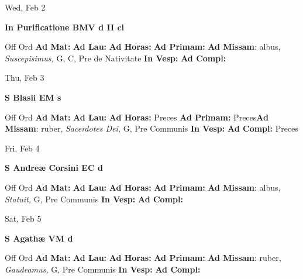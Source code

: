 \documentclass[10pt]{memoir}
\begin{document}
\begin{center}
\begin{minipage}{3.5in}
\vspace{2em}
\begin{center}Wed, Feb 2
\end{center}
\textbf{ \large In Purificatione BMV
\textnormal{\normalsize d II cl}}

\begin{justify}Off Ord
\textbf{Ad Mat: }
\textbf{Ad Lau: }
\textbf{Ad Horas: }
\textbf{Ad Primam: }\textbf{Ad Missam}: albus, \textit{Suscepisimus,} G, C, Pre de Nativitate
\textbf{In Vesp: }
\textbf{Ad Compl: }
\end{justify}
\end{minipage}
\end{center}

\begin{center}
\begin{minipage}{3.5in}
\vspace{2em}
\begin{center}Thu, Feb 3
\end{center}
\textbf{ \large S Blasii EM
\textnormal{\normalsize s}}

\begin{justify}Off Ord
\textbf{Ad Mat: }
\textbf{Ad Lau: }
\textbf{Ad Horas: }Preces
\textbf{Ad Primam: }Preces\textbf{Ad Missam}: ruber, \textit{Sacerdotes Dei,} G, Pre Communis
\textbf{In Vesp: }
\textbf{Ad Compl: }Preces
\end{justify}
\end{minipage}
\end{center}

\begin{center}
\begin{minipage}{3.5in}
\vspace{2em}
\begin{center}Fri, Feb 4
\end{center}
\textbf{ \large S Andreæ Corsini EC
\textnormal{\normalsize d}}

\begin{justify}Off Ord
\textbf{Ad Mat: }
\textbf{Ad Lau: }
\textbf{Ad Horas: }
\textbf{Ad Primam: }\textbf{Ad Missam}: albus, \textit{Statuit,} G, Pre Communis
\textbf{In Vesp: }
\textbf{Ad Compl: }
\end{justify}
\end{minipage}
\end{center}

\begin{center}
\begin{minipage}{3.5in}
\vspace{2em}
\begin{center}Sat, Feb 5
\end{center}
\textbf{ \large S Agathæ VM
\textnormal{\normalsize d}}

\begin{justify}Off Ord
\textbf{Ad Mat: }
\textbf{Ad Lau: }
\textbf{Ad Horas: }
\textbf{Ad Primam: }\textbf{Ad Missam}: ruber, \textit{Gaudeamus,} G, Pre Communis
\textbf{In Vesp: }
\textbf{Ad Compl: }
\end{justify}
\end{minipage}
\end{center}
\end{document}
